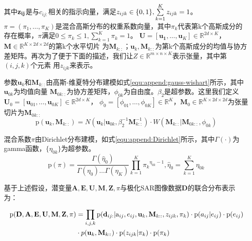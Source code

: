 其中$\bf{z_{ij}}$是与$c_{ij:}$相关的指示向量，满足${z_{ijk}} \in {\rm{\{ 0,1\} ,}}\sum\limits_{k = 1}^K {{z_{ijk}} = 1}$。
$\pi  = ({\pi _1}, \ldots ,{\pi _K})$是混合高斯分布的权重系数向量，其中$\pi_k$代表第k个高斯成分的存在概率，$\pi$满足$0 \le {\pi _k} \le 1,\sum\limits_{k = 1}^K {{\pi _k} = 1}$。
${\mathbf{U}} = \left[ {{{\mathbf{u}}_{\mathbf{1}}}, \ldots ,{{\mathbf{u}}_K}} \right] \in {\mathbb{R}^{2d \times K}}$，${\mathbf{M}} \in {\mathbb{R}^{K \times 2d \times 2d}}$的第k个水平切片
为${{\mathbf{M}}_{k::}}$；${{\mathbf{u}}_k},{{\mathbf{M}}_{k::}}$为第k个高斯成分的均值与协方差矩阵。再次为了便于下面的描述，我们让$Z \in {\mathbb{R}^{m \times n \times K}}$表示张量，其中第$(i,j,k)$个元素
用$z_{ijk}$来表示。

参数${{\mathbf{u}}_k}$和${{\mathbf{M}}_{k::}}$由高斯-维夏特分布建模如式\ref{equ:append:gauss-wishart}所示，其中${{\mathbf{u}}_{0k}}$为均值向量
${{\mathbf{M}}_{0k::}}$为协方差矩阵，${\phi _{0k}}$为自由度。$\beta_2$是超参数。这里我们定义${{\mathbf{U}}_0} = \left[ {{{\mathbf{u}}_{01}}, \ldots ,{{\mathbf{u}}_{0K}}} \right] \in {\mathbb{R}^{2d \times K}}$，
${\phi _0} = \left[ {{\phi _{01}}, \ldots ,{\phi _{0K}}} \right] \in {\mathbb{R}^K}$，${{\mathbf{M}}_0} \in {\mathbb{R}^{K \times 2d \times 2d}}$为张量切片为${{\mathbf{M}}_{0k::}}$
    \begin{equation}
        \label{equ:append:gauss-wishart}
        {\text{p}}({{\mathbf{u}}_k},{{\mathbf{M}}_{k::}}) = N({{\mathbf{u}}_k}|{{\mathbf{u}}_{0k}},\beta _2^{ - 1}{\mathbf{M}}_{k::}^{ - 1}) \cdot W({{\mathbf{M}}_{k::}}|{{\mathbf{M}}_{0k::}},{\phi _{0k}})
    \end{equation}

混合系数$\pi$由Dirichlet分布建模，如式\ref{equ:append:Dirichlet}所示，其中$\Gamma(\cdot)$为gamma函数，$\{ {\eta _{0k}}\} $为超参数。
    \begin{equation}
        \label{equ:append:Dirichlet}
        {\text{p}}(\pi ) = \frac{{\Gamma ({{\hat \eta }_0})}}{{\Gamma ({\eta _0}) \ldots \Gamma ({\eta _K})}}\prod\limits_{k = 1}^K {{\pi _k}^{{\eta _{0k}} - 1},{{\hat \eta }_0}}  = \sum\limits_{k = 1}^K {{\eta _{0k}}}
    \end{equation}

基于上述假设，潜变量${\mathbf{A,E,U,M,Z}},\pi$与极化SAR图像数据$\mathbf{D}$的联合分布表示为：

\begin{equation}
    \begin{aligned}
    {\rm{p}}({\bf{D}},{\bf{A,E,U,M,Z}},\pi ) &= \prod\limits_{i,j,k} {{\rm{p}}({{\bf{d}}_{ij:}}{\rm{|}}{{\rm{a}}_{ij}},{e_{ij}},{{\bf{u}}_k},{{\bf{M}}_{k::}},{z_{ijk}},{\pi _k}) \cdot {\rm{p}}({a_{ij}}|{e_{ij}}) \cdot {\rm{p}}} ({e_{ij}})\\
    & \cdot p({{\bf{u}}_k},{{\bf{M}}_{k::}}) \cdot {\rm{p}}({z_{ijk}}|{\pi _k}) \cdot {\rm{p}}({\pi _k})
   \end{aligned}
   \label{equ:append:join}
\end{equation}

